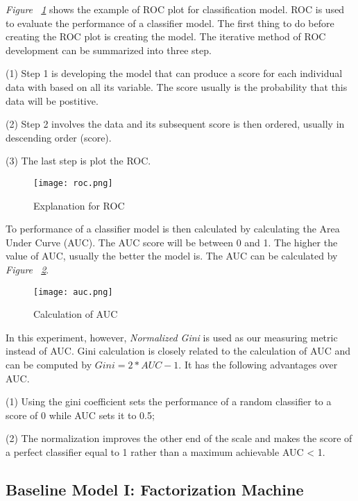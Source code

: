 \documentclass{article}
\begin{document}
    \emph{Figure ~\ref{fig:roc}} shows the example of ROC plot for classification model. ROC is used to evaluate the performance of a classifier model. The first thing to do before creating the ROC plot is creating the model. The iterative method of ROC development can be summarized into three step. 

    (1) Step 1 is developing the model that can produce a score for each individual data with based on all its variable. The score usually is the probability that this data will be postitive. 

    (2) Step 2 involves the data and its subsequent score is then ordered, usually in descending order (score). 

    (3) The last step is plot the ROC. ~\cite{gini}

    \begin{figure}[!h]
		\centering
		\texttt{[image: roc.png]}
		\caption{\small{Explanation for ROC~\cite{gini}}}
		\label{fig:roc}
	\end{figure}

    To performance of a classifier model is then calculated by calculating the Area Under Curve (AUC). The AUC score will be between 0 and 1. The higher the value of AUC, usually the better the model is. The AUC can be calculated by \emph{Figure ~\ref{fig:auc}}.

    \begin{figure}[!h]
		\centering
		\texttt{[image: auc.png]}
		\caption{\small{Calculation of AUC~\cite{gini}}}
		\label{fig:auc}
	\end{figure}

	In this experiment, however, \emph{Normalized Gini} is used as our measuring metric instead of AUC. Gini calculation is closely related to the calculation of AUC and can be computed by $Gini = 2 * AUC - 1$. It has the following advantages over AUC.

	(1) Using the gini coefficient sets the performance of a random classifier to a score of 0 while AUC sets it to 0.5; 

	(2) The normalization improves the other end of the scale and makes the score of a perfect classifier equal to 1 rather than a maximum achievable AUC < 1. 


    \subsection{Baseline Model I: Factorization Machine}
    
\end{document}
